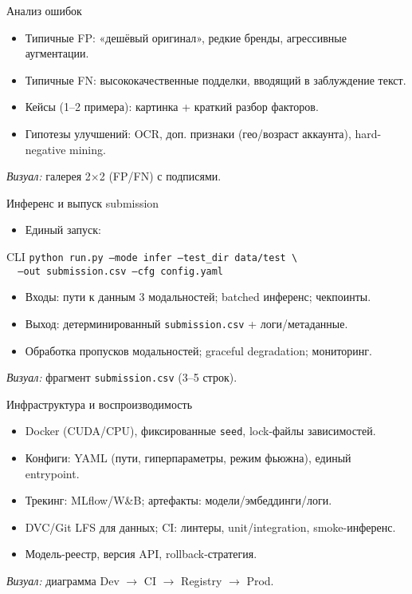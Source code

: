 \documentclass[aspectratio=169,10pt]{beamer}
\begin{document}
\begin{frame}{Анализ ошибок}
\begin{itemize}
  \item Типичные FP: «дешёвый оригинал», редкие бренды, агрессивные аугментации.
  \item Типичные FN: высококачественные подделки, вводящий в заблуждение текст.
  \item Кейсы (1–2 примера): картинка + краткий разбор факторов.
  \item Гипотезы улучшений: OCR, доп. признаки (гео/возраст аккаунта), hard-negative mining.
\end{itemize}
\medskip
\textit{Визуал:} галерея 2$\times$2 (FP/FN) с подписями.
\end{frame}

\begin{frame}{Инференс и выпуск submission}
\begin{itemize}
  \item Единый запуск:
\end{itemize}
\begin{block}{CLI}
\texttt{python run.py --mode infer --test\_dir data/test \textbackslash{}}\\
\texttt{\ \ --out submission.csv --cfg config.yaml}
\end{block}
\begin{itemize}
  \item Входы: пути к данным 3 модальностей; batched инференс; чекпоинты.
  \item Выход: детерминированный \texttt{submission.csv} + логи/метаданные.
  \item Обработка пропусков модальностей; graceful degradation; мониторинг.
\end{itemize}
\medskip
\textit{Визуал:} фрагмент \texttt{submission.csv} (3–5 строк).
\end{frame}

\begin{frame}{Инфраструктура и воспроизводимость}
\begin{itemize}
  \item Docker (CUDA/CPU), фиксированные \texttt{seed}, lock-файлы зависимостей.
  \item Конфиги: YAML (пути, гиперпараметры, режим фьюжна), единый entrypoint.
  \item Трекинг: MLflow/W\&B; артефакты: модели/эмбеддинги/логи.
  \item DVC/Git LFS для данных; CI: линтеры, unit/integration, smoke-инференс.
  \item Модель-реестр, версия API, rollback-стратегия.
\end{itemize}
\medskip
\textit{Визуал:} диаграмма Dev $\to$ CI $\to$ Registry $\to$ Prod.
\end{frame}
\end{document}
